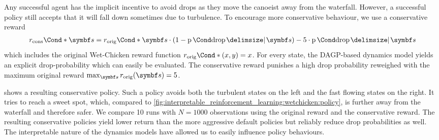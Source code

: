 Any successful agent has the implicit incentive to avoid drops as they move the canoeist away from the waterfall.
However, a successful policy still accepts that it will fall down sometimes due to turbulence.
To encourage more conservative behaviour, we use a conservative reward
\begin{align}
    \Fun*{r_\text{cons}}{\mat{s}} =
    \Fun*{r_\text{orig}}{\mat{s}} \cdot \left(1 - \Prob{\text{drop} \given \mat{s}}\right)
    - 5 \cdot \Prob{\text{drop} \given \mat{s}}
\end{align}
which includes the original Wet-Chicken reward function $\Fun*{r_\text{orig}}{(x, y)} = x$.
For every state, the DAGP-based dynamics model yields an explicit drop-probability which can easily be evaluated.
The conservative reward punishes a high drop probability reweighed with the maximum original reward $\max_{\mat{s}} r_\text{orig}(\mat{s}) = 5$.

 shows a resulting conservative policy.
Such a policy avoids both the turbulent states on the left and the fast flowing states on the right.
It tries to reach a sweet spot, which, compared to \cref{fig:interpretable_reinforcement_learning:wetchicken:policy}, is further away from the waterfall and therefore safer.
We compare 10 runs with $N=1000$ observations using the original reward and the conservative reward.
The resulting conservative policies yield lower return than the more aggressive default policies but reliably reduce drop probabilities as well.
The interpretable nature of the dynamics models have allowed us to easily influence policy behaviours.


